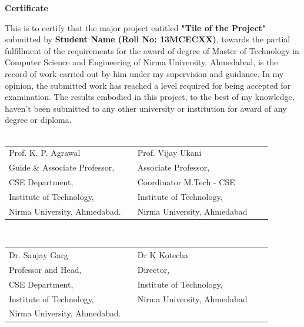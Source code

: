 \newpage
\vspace{4cm}
\begin{center}
{\Large \bf Certificate}\\
\end{center}
\vspace{10pt}

\noindent This is to certify that the major project entitled
 \textbf{"Tile of the Project"} submitted by \textbf{Student Name (Roll No: 13MCECXX)}, towards the partial fulfillment of the requirements for the award of degree of Master of Technology in Computer Science and Engineering of Nirma University, Ahmedabad, is the record of work carried out by him under my supervision and guidance. In my opinion, the submitted work has reached a level required for being accepted for examination. The results embodied in this project, to the best of my knowledge, haven't been submitted to any other university or institution for award of any degree or diploma. \\
\vspace{2cm} \\
\noindent


\vspace{2cm} \noindent
\begin{tabular}{ l p{3.1cm}lp{4cm}l }
Prof. K. P. Agrawal & \hspace{0.3cm} & Prof. Vijay Ukani\\
Guide \& Associate Professor, & & Associate Professor, \\
CSE Department, & & Coordinator M.Tech - CSE\\
Institute of Technology, & & Institute of Technology,\\
Nirma University, Ahmedabad. & & Nirma University, Ahmedabad\\
\end{tabular} \\



\vspace{2cm} \noindent
\begin{tabular}{ l p{3.1cm}lp{4cm}l }
Dr. Sanjay Garg & \hspace{0.3cm} & Dr K Kotecha\\
Professor and Head, & & Director, \\
CSE Department, & & Institute of Technology,\\
Institute of Technology, & & Nirma University, Ahmedabad\\
Nirma University, Ahmedabad. & & \\
\end{tabular} \\



